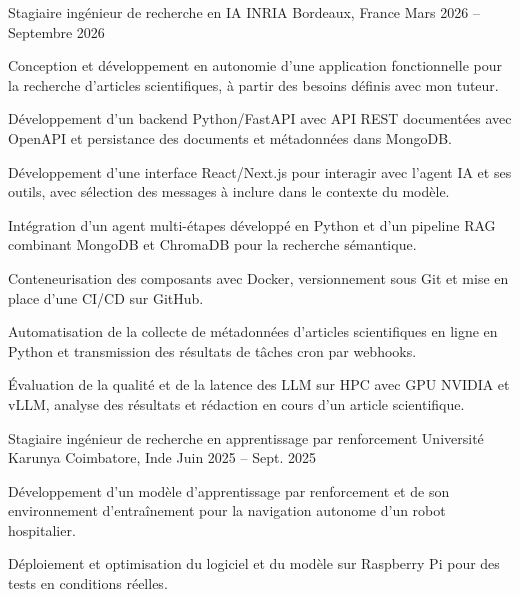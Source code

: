 
\begin{cventries}
  \cventry
    {Stagiaire ingénieur de recherche en IA}
    {INRIA}
    {Bordeaux, France}
    {Mars 2026 -- Septembre 2026}
    {
      \begin{cvitems}
        \item {Conception et développement en autonomie d’une application fonctionnelle pour la recherche d’articles scientifiques, à partir des besoins définis avec mon tuteur.}
        \item {Développement d’un backend Python/FastAPI avec API REST documentées avec OpenAPI et persistance des documents et métadonnées dans MongoDB.}
        \item {Développement d’une interface React/Next.js pour interagir avec l’agent IA et ses outils, avec sélection des messages à inclure dans le contexte du modèle.}
        \item {Intégration d’un agent multi-étapes développé en Python et d’un pipeline RAG combinant MongoDB et ChromaDB pour la recherche sémantique.}
        \item {Conteneurisation des composants avec Docker, versionnement sous Git et mise en place d’une CI/CD sur GitHub.}
        \item {Automatisation de la collecte de métadonnées d’articles scientifiques en ligne en Python et transmission des résultats de tâches cron par webhooks.}
        \item {Évaluation de la qualité et de la latence des LLM sur HPC avec GPU NVIDIA et vLLM, analyse des résultats et rédaction en cours d’un article scientifique.}
      \end{cvitems}
    }

  \cventry
    {Stagiaire ingénieur de recherche en apprentissage par renforcement}
    {Université Karunya}
    {Coimbatore, Inde}
    {Juin 2025 -- Sept. 2025}
    {
      \begin{cvitems}
        \item {Développement d’un modèle d’apprentissage par renforcement et de son environnement d’entraînement pour la navigation autonome d’un robot hospitalier.}
        \item {Déploiement et optimisation du logiciel et du modèle sur Raspberry Pi pour des tests en conditions réelles.}
      \end{cvitems}
    }
\end{cventries}
